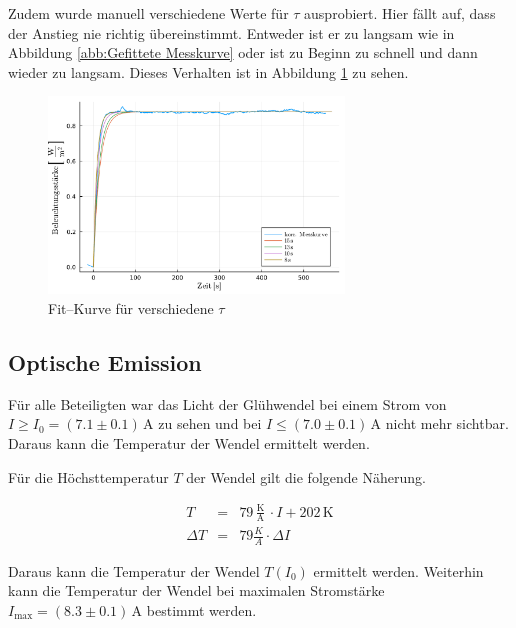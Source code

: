 \documentclass[12pt,a4paper]{scrartcl}
\numberwithin{equation}{section} %
\begin{document}
Zudem wurde manuell verschiedene Werte für $\tau$ ausprobiert. Hier fällt auf, dass der Anstieg nie richtig übereinstimmt. Entweder ist er zu langsam wie in Abbildung \ref{abb:Gefittete Messkurve} oder ist zu Beginn zu schnell und dann wieder zu langsam. Dieses Verhalten ist in Abbildung \ref{abb:Fit für verschiedene tau} zu sehen.

\begin{figure}[h!]
	\centering
	\includegraphics[width=0.7\textwidth]{../media/B1.1/versZeitkonst.pdf}
	\caption{Fit--Kurve für verschiedene $\tau$}
	\label{abb:Fit für verschiedene tau}
\end{figure}

\subsection{Optische Emission}
\label{Optische Emission}
Für alle Beteiligten war das Licht der Glühwendel bei einem Strom von $I\ge I_0=(7.1 \pm 0.1)\mathrm{\,A}$ zu sehen und bei $I\le (7.0 \pm 0.1)\mathrm{\,A}$ nicht mehr sichtbar. Daraus kann die Temperatur der Wendel ermittelt werden.

Für die Höchsttemperatur $T$ der Wendel gilt die folgende Näherung.

\begin{eqnarray}
	T &=& 79 \mathrm{\,\frac{K}{A}\,} \cdot I + 202\mathrm{\,K} \\
	\Delta T &=& 79 \frac{K}{A} \cdot \Delta I
\end{eqnarray}

\noindent
Daraus kann die Temperatur der Wendel $T(I_0)$ ermittelt werden. Weiterhin kann die Temperatur der Wendel bei maximalen Stromstärke $I_\mathrm{max} = (8.3 \pm 0.1)\mathrm{\,A}$ bestimmt werden.

\end{document}
